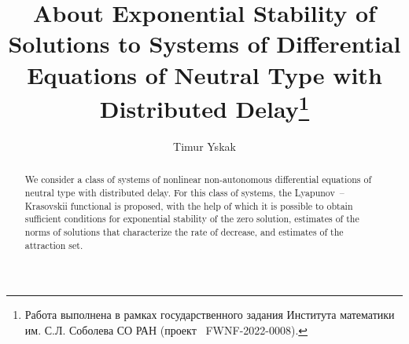 \begin{englishtitle} %
\title{About Exponential Stability of Solutions to
Systems of Differential Equations of Neutral Type with Distributed
Delay\thanks{Работа выполнена в рамках государственного задания Института математики им. С.Л. Соболева СО РАН (проект \textnumero~FWNF-2022-0008).}}
\author{Timur Yskak  
}
\maketitle

\begin{abstract}
We consider a class of systems of nonlinear non-autonomous differential equations of neutral type with distributed delay. For this class of systems, the Lyapunov~-- Krasovskii functional is proposed, with the help of which it is possible to obtain sufficient conditions for exponential stability of the zero solution, estimates of the norms of solutions that characterize the rate of decrease, and estimates of the attraction set.

\end{abstract}
\end{englishtitle}

\iffalse
%
%

